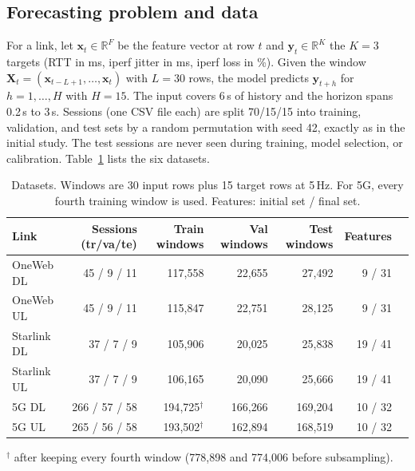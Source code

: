 \subsection{Forecasting problem and data}
For a link, let $\mathbf{x}_t\in\mathbb{R}^{F}$ be the feature vector at row $t$ and $\mathbf{y}_t\in\mathbb{R}^{K}$ the $K=3$ targets (RTT in ms, iperf jitter in ms, iperf loss in \%). Given the window $\mathbf{X}_t=(\mathbf{x}_{t-L+1},\dots,\mathbf{x}_t)$ with $L=30$ rows, the model predicts $\mathbf{y}_{t+h}$ for $h=1,\dots,H$ with $H=15$. The input covers 6\,s of history and the horizon spans 0.2\,s to 3\,s. Sessions (one CSV file each) are split 70/15/15 into training, validation, and test sets by a random permutation with seed 42, exactly as in the initial study. The test sessions are never seen during training, model selection, or calibration. Table~\ref{tab:data} lists the six datasets.

\begin{table}[htbp]
\centering
\caption{Datasets. Windows are 30 input rows plus 15 target rows at 5\,Hz. For 5G, every fourth training window is used. Features: initial set / final set.}
\label{tab:data}
\small
\begin{tabular}{lrrrrrr}
\toprule
Link & Sessions (tr/va/te) & Train windows & Val windows & Test windows & Features \\
\midrule
OneWeb DL   & 45 / 9 / 11   & 117{,}558 & 22{,}655  & 27{,}492  & 9 / 31 \\
OneWeb UL   & 45 / 9 / 11   & 115{,}847 & 22{,}751  & 28{,}125  & 9 / 31 \\
Starlink DL & 37 / 7 / 9    & 105{,}906 & 20{,}025  & 25{,}838  & 19 / 41 \\
Starlink UL & 37 / 7 / 9    & 106{,}165 & 20{,}090  & 25{,}666  & 19 / 41 \\
5G DL       & 266 / 57 / 58 & 194{,}725$^\dagger$ & 166{,}266 & 169{,}204 & 10 / 32 \\
5G UL       & 265 / 56 / 58 & 193{,}502$^\dagger$ & 162{,}894 & 168{,}519 & 10 / 32 \\
\bottomrule
\end{tabular}

\smallskip
\footnotesize $^\dagger$ after keeping every fourth window (778{,}898 and 774{,}006 before subsampling).
\end{table}
